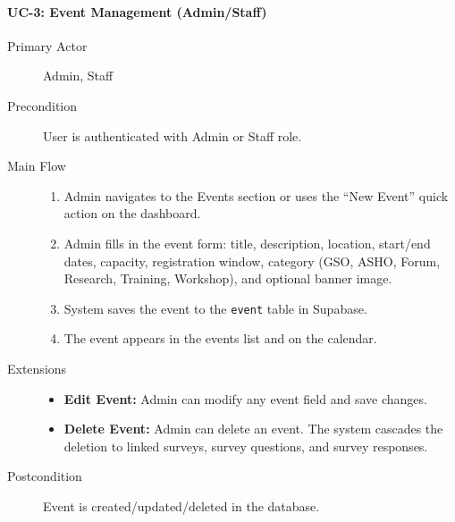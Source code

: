 \documentclass[11pt,a4paper]{article}
\begin{document}
\paragraph{UC-3: Event Management (Admin/Staff)}
\begin{description}
  \item[Primary Actor] Admin, Staff
  \item[Precondition] User is authenticated with Admin or Staff role.
  \item[Main Flow]
    \begin{enumerate}[leftmargin=1.5em]
      \item Admin navigates to the Events section or uses the ``New Event'' quick action on the dashboard.
      \item Admin fills in the event form: title, description, location, start/end dates, capacity, registration window, category (GSO, ASHO, Forum, Research, Training, Workshop), and optional banner image.
      \item System saves the event to the \texttt{event} table in Supabase.
      \item The event appears in the events list and on the calendar.
    \end{enumerate}
  \item[Extensions]
    \begin{itemize}[leftmargin=1.5em]
      \item \textbf{Edit Event:} Admin can modify any event field and save changes.
      \item \textbf{Delete Event:} Admin can delete an event. The system cascades the deletion to linked surveys, survey questions, and survey responses.
    \end{itemize}
  \item[Postcondition] Event is created/updated/deleted in the database.
\end{description}
\end{document}
